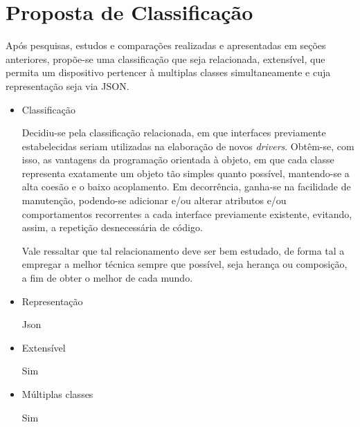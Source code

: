 \chapter{Proposta de Classificação}

Após pesquisas, estudos e comparações realizadas e apresentadas em seções anteriores, propõe-se uma classificação que seja relacionada, extensível, que permita um dispositivo pertencer à multiplas classes simultaneamente e cuja representação seja via JSON.


\begin{comment}
Neste capítulo falaremos sobre a Classificação de Dispositivos proposta. Essa classificação deverá ser relacionada, extensível e um dispositivo deverá poder fazer parte de múltiplas classes. A classificação relacionada facilita a implementação de novos \emph{drivers} para o \emph{uOS} que poderão se aproveitar das interfaces já existentes. Ser extensível, pois permite uma relação de especialização entre diferentes classes. A capacidade de permitir que um dispositivo pertença à diferentes classes, garante uma flexibilidade para dispositivos com diversos recursos poderem se encaixar nas classificações padrões sem a necessidade da definição de uma nova classe.
\end{comment}

\begin{itemize}
	\item Classificação

	Decidiu-se pela classificação relacionada, em que interfaces previamente estabelecidas seriam utilizadas na elaboração de novos \emph{drivers}. Obtêm-se, com isso, as vantagens da programação orientada à objeto, em que cada classe representa exatamente um objeto tão simples quanto possível, mantendo-se a alta coesão e o baixo acoplamento. Em decorrência, ganha-se na facilidade de manutenção, podendo-se adicionar e/ou alterar atributos e/ou comportamentos recorrentes a cada interface previamente existente, evitando, assim, a repetição desnecessária de código.

	Vale ressaltar que tal relacionamento deve ser bem estudado, de forma tal a empregar a melhor técnica sempre que possível, seja herança ou composição, a fim de obter o melhor de cada mundo.

	\item Representação

	Json

	\item Extensível

	Sim

	\item Múltiplas classes

	Sim
\end{itemize}

